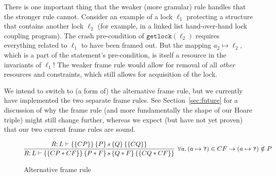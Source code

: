 There is one important thing that the weaker (more granular) rule handles that
the stronger rule cannot.
Consider an example of a lock $\ell_1$ protecting a
structure that contains another lock $\ell_2$ (for example, in a linked list
hand-over-hand lock coupling program).
The crash pre-condition of
$\texttt{getlock}(\ell_2)$ requires everything related to $\ell_1$ to have been
framed out.
But the mapping $a_2\mapsto\ell_2$, which is a part of the
statement's pre-condition, is itself a resource in the invariants of $\ell_1$!
The weaker frame rule would allow for removal of all \textit{other} resources
and constraints, which still allows for acquisition of the lock.

We intend to switch to (a form of) the alternative frame rule, but we currently
have implemented the two separate frame rules.
See Section~\ref{sec:future} for a discussion
of why the frame rule (and more fundamentally the shape of our Hoare triple)
might still change further, whereas we expect (but have not yet proven) that
our two current frame rules are sound.

\begin{figure*}
\begin{gather*}
    \infer[\forall a, (a \mapsto\texttt{?}) \in CF \imp
    (a\mapsto\texttt{?}) \notin P]
	{\hoarestmt{R}{L}{CP * CF}{P * F}{s}{Q * F}{CQ * CF}}
	{\hoarestmt{R}{L}{CP}{P}{s}{Q}{CQ}}
\end{gather*}
\caption{Alternative frame rule}
\label{fig:altframe}
\end{figure*}

%

